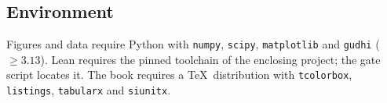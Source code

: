 \subsection*{Environment}

Figures and data require Python with \texttt{numpy}, \texttt{scipy},
\texttt{matplotlib} and \texttt{gudhi} ($\ge 3.13$). Lean requires the pinned
toolchain of the enclosing project; the gate script locates it. The book requires
a \TeX\ distribution with \texttt{tcolorbox}, \texttt{listings},
\texttt{tabularx} and \texttt{siunitx}.
